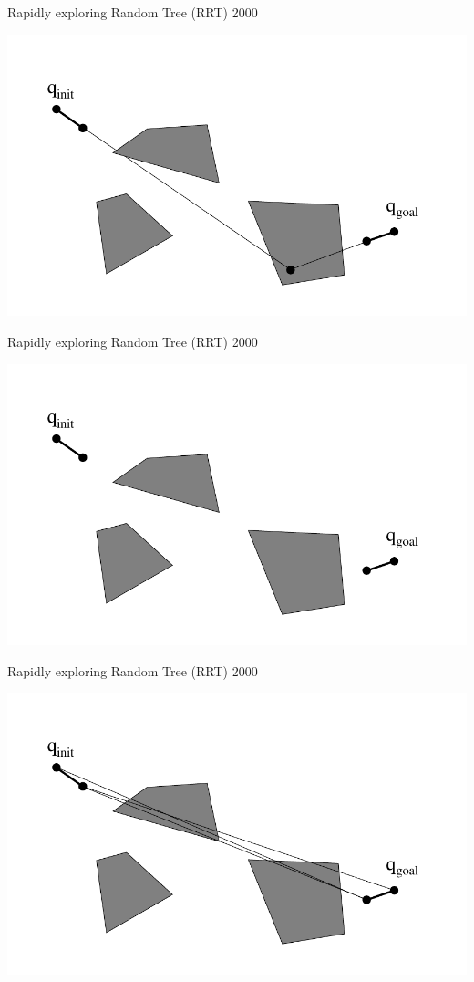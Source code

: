 \begin{frame} {Rapidly exploring Random Tree (RRT) 2000}
\centerline {
  \includegraphics[width=.8\linewidth]{figures/RRT3.pdf}
}
\end{frame}

\begin{frame} {Rapidly exploring Random Tree (RRT) 2000}
\centerline {
  \includegraphics[width=.8\linewidth]{figures/RRT4.pdf}
}
\end{frame}

\begin{frame} {Rapidly exploring Random Tree (RRT) 2000}
\centerline {
  \includegraphics[width=.8\linewidth]{figures/RRT5.pdf}
}
\end{frame}

